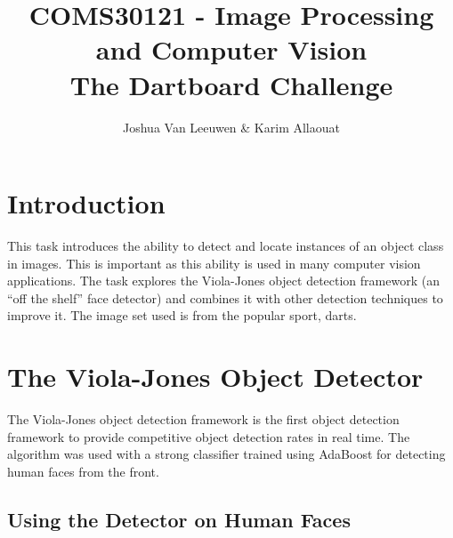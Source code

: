 \documentclass[a4paper]{article}
\title{\vspace{-3em}COMS30121 - Image Processing and Computer Vision\\The Dartboard Challenge\vspace{-0.3em}}
\author{Joshua Van Leeuwen \& Karim Allaouat}
\date{}
\begin{document}
\vspace{-10em}
\maketitle
\vspace{-4em}

\setcounter{section}{-1}
\section*{Introduction}

This task introduces the ability to detect and locate instances of an object
class in images. This is important as this ability is used in many computer
vision applications. The task explores the Viola-Jones object detection
framework (an “off the shelf” face detector) and combines it with other
detection techniques to improve it. The image set used is from the popular
sport, darts.

\section*{The Viola-Jones Object Detector}

The Viola-Jones object detection framework is the first object detection
framework to provide competitive object detection rates in real time. The
algorithm was used with a strong classifier trained using AdaBoost for
detecting human faces from the front.

\subsection*{Using the Detector on Human Faces}
\vspace{-0.7em}
\end{document}

